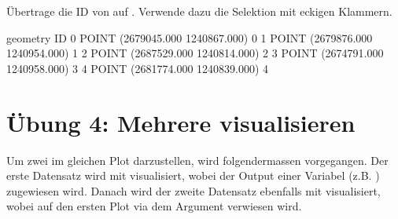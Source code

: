 \documentclass[letterpaper,10pt,english]{sphinxmanual}
\begin{document}
Übertrage die ID von  auf . Verwende dazu die Selektion mit eckigen Klammern.

\begin{sphinxVerbatim}[commandchars=\\\{\}]
\PYG{p}{[}\PYG{p}{]}  \PYG{p}{[}\PYG{p}{]}
\end{sphinxVerbatim}

\begin{sphinxVerbatim}[commandchars=\\\{\}]
                          geometry  ID
0  POINT (2679045.000 1240867.000)   0
1  POINT (2679876.000 1240954.000)   1
2  POINT (2687529.000 1240814.000)   2
3  POINT (2674791.000 1240958.000)   3
4  POINT (2681774.000 1240839.000)   4
\end{sphinxVerbatim}


\section{Übung 4: Mehrere  visualisieren}
\label{\detokenize{02_05_Punkte_einer_GeoDataFrame_verschieben:ubung-4-mehrere-geodataframes-visualisieren}}
Um zwei  im gleichen Plot darzustellen, wird folgendermassen vorgegangen. Der erste Datensatz wird mit  visualisiert, wobei der Output einer Variabel  (z.B. )  zugewiesen wird. Danach wird der zweite Datensatz ebenfalls mit  visualisiert, wobei auf den ersten Plot via dem Argument  verwiesen wird.

\begin{sphinxVerbatim}[commandchars=\\\{\}]
    
     
\end{sphinxVerbatim}
\end{document}

